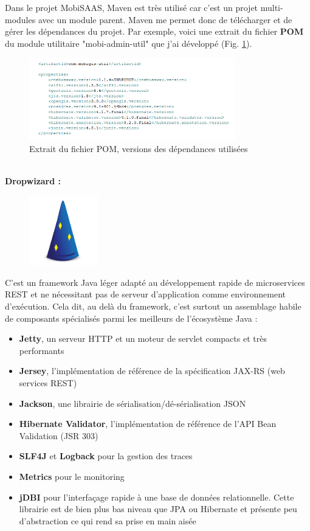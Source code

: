 \begin{itemize}
Dans le projet MobiSAAS, Maven est très utilisé car c'est un projet multi-modules avec un module parent. Maven me permet donc de télécharger et de gérer les dépendances du projet. Par exemple, voici une extrait du fichier \textbf{POM} du module utilitaire "mobi-admin-util" que j'ai développé (Fig. \ref{fig:MavenPOM}). 
\\
\begin{figure}[h]
	\centering
		\includegraphics[width=0.8\textwidth]{images/Maven_POM_properties_Mobi-Admin-util.PNG}
	\caption{\label{fig:MavenPOM}Extrait du fichier POM, versions des dépendances utilisées}
\end{figure}\\


\textbf{Dropwizard :}\label{Dropwizard}

\begin{figure}
\centering
\includegraphics[width=3cm]{images/dropwizard.png}
\end{figure}
\noindent C'est un framework Java léger adapté au développement rapide de microservices REST et ne nécessitant pas de serveur d'application comme environnement d'exécution.
Cela dit, au delà du framework, c'est surtout un assemblage habile de composants spécialisés parmi les meilleurs de l'écosystème Java :\\
\begin{itemize}
\item \textbf{Jetty}, un serveur HTTP et un moteur de servlet compacts et très performants 
\item \textbf{Jersey}, l'implémentation de référence de la spécification JAX-RS (web services REST) 
\item \textbf{Jackson}, une librairie de sérialisation/dé-sérialisation JSON 
\item \textbf{Hibernate Validator}, l'implémentation de référence de l'API Bean Validation (JSR 303) 
\item \textbf{SLF4J} et \textbf{Logback} pour la gestion des traces 
\item \textbf{Metrics} pour le monitoring 
\item \textbf{jDBI} pour l'interfaçage rapide à une base de données relationnelle. Cette librairie est de bien plus bas niveau que JPA ou Hibernate et présente peu d'abstraction ce qui rend sa prise en main aisée \\
\end{itemize}


\end{itemize}
